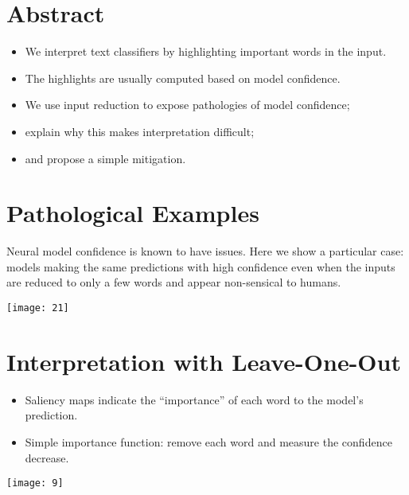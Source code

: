 \documentclass[a0,portrait]{a0poster}
\begin{document}
\begin{multicols}{2}

\large

\section*{Abstract}
\begin{itemize}
\item We interpret text classifiers by highlighting important words in the input.
\item The highlights are usually computed based on model confidence.
\item We use input reduction to expose pathologies of model confidence;
\item explain why this makes interpretation difficult;
\item and propose a simple mitigation.
\end{itemize}
\vspace{0.3cm}

\section*{Pathological Examples}
Neural model confidence is known to have issues. Here we show a particular case:
models making the same predictions with high confidence even when the inputs are
reduced to only a few words and appear non-sensical to humans.
\vspace{0.3cm}
\begin{center}
\texttt{[image: 21]}
\vspace{0.3cm}
\end{center}

\section*{Interpretation with Leave-One-Out}
\begin{itemize}
\item Saliency maps indicate the ``importance'' of each word to the model's prediction.
\item Simple importance function: remove each word and measure the confidence decrease.
\end{itemize}
\vspace{0.3cm}
\begin{center}
\texttt{[image: 9]}
\end{center}
\vspace{0.3cm}


\end{multicols}
\end{document}
